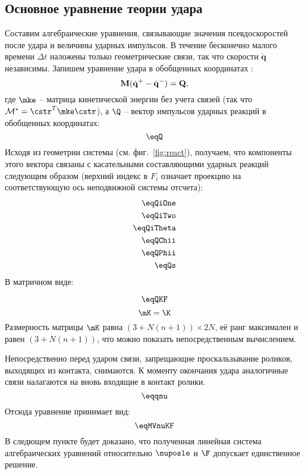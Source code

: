 \subsection{Основное уравнение теории удара}\label{sect:impact_classical}
Составим алгебраические уравнения, связывающие значения псевдоскоростей после удара и величины ударных импульсов. В течение бесконечно малого времени $\Delta t$ наложены только геометрические связи, так что скорости $\dot{\mathbf{q}}$ независимы. Запишем уравнение удара в обобщенных координатах \cite{Vilke}:
\begin{equation}\label{eq:udar_general}
\eqDeltaqQ,
\end{equation}
где $\mke$ -- матрица кинетической энергии без учета связей (так что $\M^* = \cstr^T \mke \cstr$), а $\Q$ -- вектор импульсов ударных реакций в обобщенных координатах:
\begin{equation*}
\eqQ
\end{equation*}
Исходя из геометрии системы (см. фиг.~\ref{fig:react}), получаем, что компоненты этого вектора связаны с касательными составляющими ударных реакций следующим образом (верхний индекс в $F_i^\cdot$ означает проекцию на соответствующую ось неподвижной системы отсчета):
\begin{eqnarray*}
\eqQiOne \\
\eqQiTwo \\
\eqQiTheta \\
\eqQChii \\
\eqQPhii \\
\eqQs
\end{eqnarray*}
В матричном виде:

\begin{equation*}
\eqQKF
\end{equation*}
\begin{equation*}
\mK = \K
\end{equation*}
Размерность матрицы $\mK$ равна $(3 + N(n+1)) \times 2N$, её ранг максимален и равен $(3 + N(n+1))$, что можно показать непосредственным вычислением.

Непосредственно перед ударом связи, запрещающие проскальзывание роликов, выходящих из контакта, снимаются.
К моменту окончания удара аналогичные связи налагаются на вновь входящие в контакт ролики.
\begin{equation*}
\eqqnu
\end{equation*}
Отсюда уравнение  принимает вид:
\begin{equation}\label{eq:udar_mat}
\eqMVnuKF
\end{equation}
В следющем пункте будет доказано, что полученная линейная система алгебраических уравнений относительно $\nuposle$ и $\F$ допускает единственное решение.


